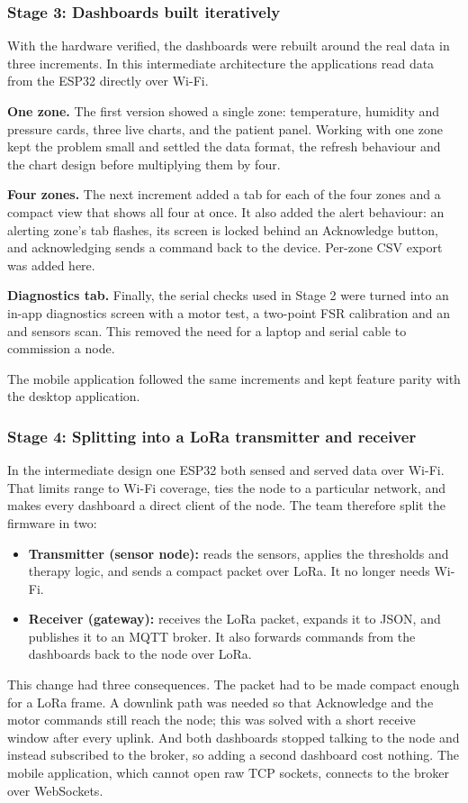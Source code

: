 \subsubsection{Stage 3: Dashboards built iteratively}
With the hardware verified, the dashboards were rebuilt around the real data in three increments. In this intermediate architecture the applications read data from the ESP32 directly over Wi-Fi.

\textbf{One zone.} The first version showed a single zone: temperature, humidity and pressure cards, three live charts, and the patient panel. Working with one zone kept the problem small and settled the data format, the refresh behaviour and the chart design before multiplying them by four.

\textbf{Four zones.} The next increment added a tab for each of the four zones and a compact view that shows all four at once. It also added the alert behaviour: an alerting zone's tab flashes, its screen is locked behind an Acknowledge button, and acknowledging sends a command back to the device. Per-zone CSV export was added here.

\textbf{Diagnostics tab.} Finally, the serial checks used in Stage 2 were turned into an in-app diagnostics screen with a motor test, a two-point FSR calibration and an \itwoc{} and sensors scan. This removed the need for a laptop and serial cable to commission a node.

The mobile application followed the same increments and kept feature parity with the desktop application.

\subsubsection{Stage 4: Splitting into a LoRa transmitter and receiver}
In the intermediate design one ESP32 both sensed and served data over Wi-Fi. That limits range to Wi-Fi coverage, ties the node to a particular network, and makes every dashboard a direct client of the node. The team therefore split the firmware in two:
\begin{itemize}
\item \textbf{Transmitter (sensor node):} reads the sensors, applies the thresholds and therapy logic, and sends a compact packet over LoRa. It no longer needs Wi-Fi.
\item \textbf{Receiver (gateway):} receives the LoRa packet, expands it to JSON, and publishes it to an MQTT broker. It also forwards commands from the dashboards back to the node over LoRa.
\end{itemize}
This change had three consequences. The packet had to be made compact enough for a LoRa frame. A downlink path was needed so that Acknowledge and the motor commands still reach the node; this was solved with a short receive window after every uplink. And both dashboards stopped talking to the node and instead subscribed to the broker, so adding a second dashboard cost nothing. The mobile application, which cannot open raw TCP sockets, connects to the broker over WebSockets.

